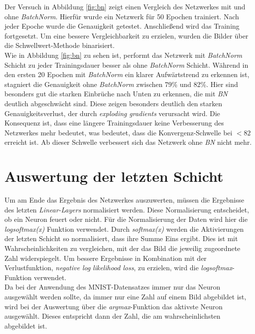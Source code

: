 Der Versuch in Abbildung \ref{fig:bn} zeigt einen Vergleich des Netzwerkes mit und ohne \textit{BatchNorm}. Hierfür wurde ein Netzwerk für 50 Epochen trainiert. Nach jeder Epoche wurde die Genauigkeit getestet. Anschließend wird das Training fortgesetzt. Um eine bessere Vergleichbarkeit zu erzielen, wurden die Bilder über die Schwellwert-Methode binarisiert.\\

Wie in Abbildung \ref{fig:bn} zu sehen ist, performt das Netzwerk mit \textit{BatchNorm} Schicht zu jeder Trainingsdauer besser als ohne \textit{BatchNorm} Schicht. Während in den ersten 20 Epochen mit \textit{BatchNorm} ein klarer Aufwärtstrend zu erkennen ist, stagniert die Genauigkeit ohne \textit{BatchNorm} zwischen 79\% und 82\%. Hier sind besonders gut die starken Einbrüche nach Unten zu erkennen, die mit \textit{BN} deutlich abgeschwächt sind. Diese zeigen besonders deutlich den starken Genauigkeitsverlust, der durch \textit{exploding gradients} verursacht wird. Die Konsequenz ist, dass eine längere Trainingsdauer keine Verbesserung des Netzwerkes mehr bedeutet, was bedeutet, dass die Konvergenz-Schwelle bei $< 82$ erreicht ist. Ab dieser Schwelle verbessert sich das Netzwerk ohne \textit{BN} nicht mehr.


\section{Auswertung der letzten Schicht}
Um am Ende das Ergebnis des Netzwerkes auszuwerten, müssen die Ergebnisse des letzten \textit{Linear-Layers} normalisiert werden. Diese Normalisierung entscheidet, ob ein Neuron feuert oder nicht. Für die Normalisierung der Daten wird hier die \textit{logsoftmax(x)} Funktion verwendet. Durch \textit{softmax(x)} werden die Aktivierungen der letzten Schicht so normalisiert, dass ihre Summe Eins ergibt. Dies ist mit Wahrscheinlichkeiten zu vergleichen, mit der das Bild die jeweilig zugeordnete Zahl widerspiegelt. Um bessere Ergebnisse in Kombination mit der Verlustfunktion, \textit{negative log likelihood loss}, zu erzielen, wird die \textit{logsoftmax}-Funktion verwendet.\\
Da bei der Anwendung des MNIST-Datensatzes immer nur das Neuron ausgewählt werden sollte, da immer nur eine Zahl auf einem Bild abgebildet ist, wird bei der Auswertung über die \textit{argmax}-Funktion das aktivste Neuron ausgewählt. Dieses entspricht dann der Zahl, die am wahrscheinlichsten abgebildet ist.


